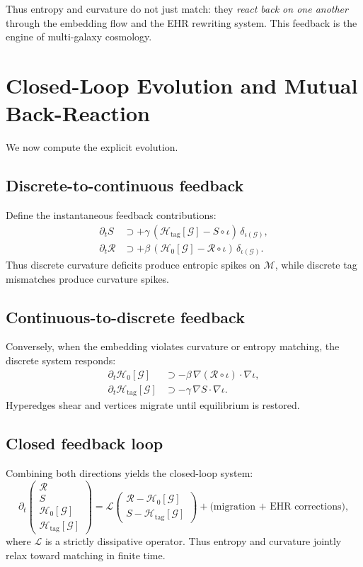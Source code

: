 Thus entropy and curvature do not just match: they \emph{react back on one another} through the embedding flow and the EHR rewriting system.  
This feedback is the engine of multi-galaxy cosmology.

\section{Closed-Loop Evolution and Mutual Back-Reaction}
\label{sec:closed-loop-evolution}

We now compute the explicit evolution.

\subsection{Discrete-to-continuous feedback}
Define the instantaneous feedback contributions:
\begin{align}
\partial_t S
  &\supset + \gamma\,(\mathcal{H}_{\mathrm{tag}}[\mathcal{G}] - S\circ\iota)\,\delta_{\iota(\mathcal{G})}, \\
\partial_t \mathcal{R}
  &\supset + \beta\,(\mathcal{H}_0[\mathcal{G}] - \mathcal{R}\circ\iota)\,\delta_{\iota(\mathcal{G})}.
\end{align}
Thus discrete curvature deficits produce entropic spikes on $\mathcal{M}$, while discrete tag mismatches produce curvature spikes.

\subsection{Continuous-to-discrete feedback}

Conversely, when the embedding violates curvature or entropy matching, the discrete system responds:
\begin{align}
\partial_t \mathcal{H}_0[\mathcal{G}]
  &\supset -\beta\,\nabla (\mathcal{R}\circ\iota)\cdot \nabla \iota, \\
\partial_t \mathcal{H}_{\mathrm{tag}}[\mathcal{G}]
  &\supset -\gamma\,\nabla S\cdot\nabla \iota.
\end{align}
Hyperedges shear and vertices migrate until equilibrium is restored.

\subsection{Closed feedback loop}

Combining both directions yields the closed-loop system:
\[
\partial_t
\begin{pmatrix}
\mathcal{R} \\
S \\[2pt]
\mathcal{H}_0[\mathcal{G}] \\
\mathcal{H}_{\mathrm{tag}}[\mathcal{G}]
\end{pmatrix}
=
\mathcal{L}
\begin{pmatrix}
\mathcal{R} - \mathcal{H}_0[\mathcal{G}] \\
S - \mathcal{H}_{\mathrm{tag}}[\mathcal{G}]
\end{pmatrix}
 + \text{(migration + EHR corrections)},
\]
where $\mathcal{L}$ is a strictly dissipative operator.  
Thus entropy and curvature jointly relax toward matching in finite time.

